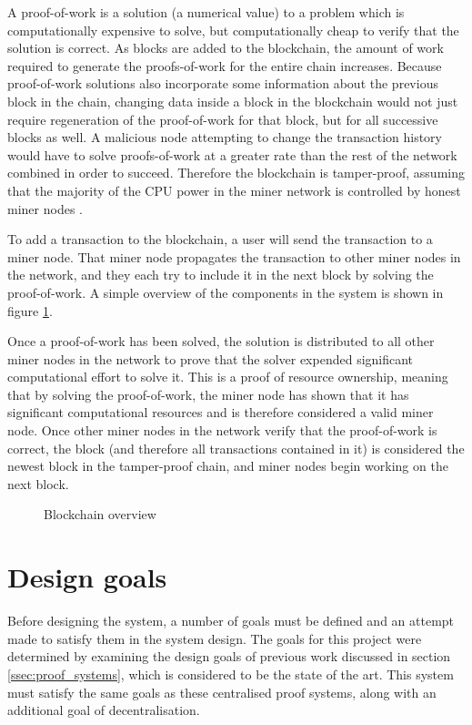 A proof-of-work is a solution (a numerical value) to a problem which is computationally expensive to solve, but computationally cheap to verify that the solution is correct. As blocks are added to the blockchain, the amount of work required to generate the proofs-of-work for the entire chain increases. Because proof-of-work solutions also incorporate some information about the previous block in the chain, changing data inside a block in the blockchain would not just require regeneration of the proof-of-work for that block, but for all successive blocks as well. A malicious node attempting to change the transaction history would have to solve proofs-of-work at a greater rate than the rest of the network combined in order to succeed. Therefore the blockchain is tamper-proof, assuming that the majority of the CPU power in the miner network is controlled by  honest miner nodes \cite{bitcoin}.

To add a transaction to the blockchain, a user will send the transaction to a miner node. That miner node propagates the transaction to other miner nodes in the network, and they each try to include it in the next block by solving the proof-of-work. A simple overview of the components in the system is shown in figure \ref{fig:blockchain}.

Once a proof-of-work has been solved, the solution is distributed to all other miner nodes in the network to prove that the solver expended significant computational effort to solve it. This is a proof of resource ownership, meaning that by solving the proof-of-work, the miner node has shown that it has significant computational resources and is therefore considered a valid miner node. Once other miner nodes in the network verify that the proof-of-work is correct, the block (and therefore all transactions contained in it) is considered the newest block in the tamper-proof chain, and miner nodes begin working on the next block.

\begin{figure}[H]
\begin{center}

\end{center}
\caption{Blockchain overview}
\label{fig:blockchain}
\end{figure}

\section{Design goals} \label{sec:design_goals}
Before designing the system, a number of goals must be defined and an attempt made to satisfy them in the system design. The goals for this project were determined by examining the design goals of previous work \cite{brassil, luo, khan} discussed in section \ref{ssec:proof_systems}, which is considered to be the state of the art. This system must satisfy the same goals as these centralised proof systems, along with an additional goal of decentralisation.

